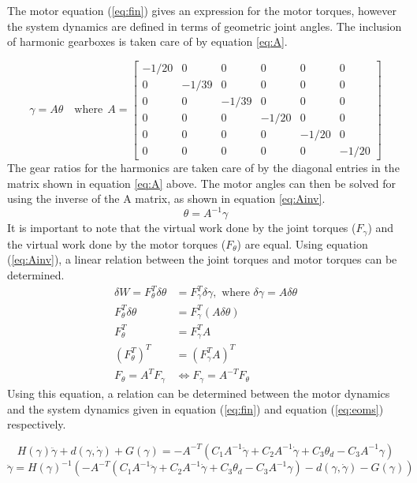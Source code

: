 The motor equation (\ref{eq:fin}) gives an expression for the motor torques, however the system dynamics are defined in terms of geometric joint angles. The inclusion of harmonic gearboxes is taken care of by equation \ref{eq:A}.

\begin{equation}
  \gamma = A\theta\quad \text{where}~~A=\left[\begin{array}{cccccc}
  -1/20 & 0 & {0} & {0} & {0} & {0} \\
   0 & -1/39 & {0} & {0} & {0} & {0} \\
    {0} & {0} & -1/39 & {0} & {0} & {0} \\
    {0} & {0} & {0} & -1/20 & {0} & {0} \\
     {0} & {0} & {0} & {0} & -1/20 & 0\\
      {0} & {0} & {0} & {0} & 0 & -1/20
    \end{array}\right]
\label{eq:A}
\end{equation}
The gear ratios for the harmonics are taken care of by the diagonal entries in the matrix shown in equation \ref{eq:A} above. The motor angles can then be solved for using the inverse of the A matrix, as shown in equation \ref{eq:Ainv}.
\begin{equation}
\theta=A^{-1} \gamma
\label{eq:Ainv}
\end{equation}
It is important to note that the virtual work done by the joint torques ($F_{\gamma}$) and the virtual work done by the motor torques ($F_{\theta}$) are equal. Using equation (\ref{eq:Ainv}), a linear relation between the joint torques and motor torques can be determined.
\[
\begin{aligned}
  \delta W = F_{\theta}^{T} \delta \theta&=F_{\gamma}^{T} \delta \gamma, \text { where } \delta \gamma=A \delta \theta \\
  F_{\theta}^{T} \delta \theta &= F_{\gamma}^{T}(A \delta \theta) \\
  F_{\theta}^{T}&=F_{\gamma}^{T} A\\
  \left(F_{\theta}^{T}\right)^{T}&=\left(F_{\gamma}^{T} A\right)^{T}\\
  F_{\theta}=A^{T} F_{\gamma} &\Leftrightarrow F_{\gamma}=A^{-T} F_{\theta}\qquad\quad
\end{aligned}
\]
Using this equation, a relation can be determined between the motor dynamics and the system dynamics given in equation (\ref{eq:fin}) and equation (\ref{eq:eoms}) respectively.

\[
H(\gamma) \ddot{\gamma}+d(\gamma, \dot{\gamma})+G(\gamma)=-A^{-T}\left(C_1A^{-1} \ddot{\gamma}+C_2 A^{-1} \dot{\gamma}+C_3 \theta_{d}- C_3A^{-1} \gamma\right)
\]
\begin{equation}
\ddot{\gamma}=H(\gamma)^{-1}\left(-A^{-T}\left(C_1 A^{-1} \ddot{\gamma}+C_2 A^{-1} \dot{\gamma}+C_3 \theta_{d}-C_3A^{-1} \gamma\right)-d(\gamma, \dot{\gamma})-G(\gamma)\right)
\label{eq:gddot}
\end{equation}


